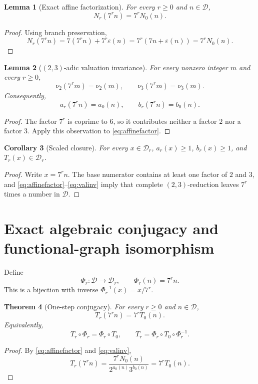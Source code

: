 \documentclass[11pt]{article}
\newtheorem{theorem}{Theorem}[section]
\newtheorem{lemma}[theorem]{Lemma}
\newtheorem{corollary}[theorem]{Corollary}
\newcommand{\eps}{\varepsilon}
\begin{document}
\begin{lemma}[Exact affine factorization]
For every $r\ge0$ and $n\in\mathcal D$,
\begin{equation}
N_r(7^rn)=7^rN_0(n).
\label{eq:affinefactor}
\end{equation}
\end{lemma}
\begin{proof}
Using branch preservation,
\[
N_r(7^rn)=7(7^rn)+7^r\eps(n)=7^r(7n+\eps(n))=7^rN_0(n).
\]
\end{proof}

\begin{lemma}[$(2,3)$-adic valuation invariance]
For every nonzero integer $m$ and every $r\ge0$,
\begin{equation}
\nu_2(7^rm)=\nu_2(m),\qquad \nu_3(7^rm)=\nu_3(m).
\label{eq:valscale}
\end{equation}
Consequently,
\begin{equation}
a_r(7^rn)=a_0(n),\qquad b_r(7^rn)=b_0(n).
\label{eq:valinv}
\end{equation}
\end{lemma}
\begin{proof}
The factor $7^r$ is coprime to $6$, so it contributes neither a factor $2$ nor a factor $3$. Apply this observation to \eqref{eq:affinefactor}.
\end{proof}

\begin{corollary}[Scaled closure]
For every $x\in\mathcal D_r$, $a_r(x)\ge1$, $b_r(x)\ge1$, and $T_r(x)\in\mathcal D_r$.
\end{corollary}
\begin{proof}
Write $x=7^rn$. The base numerator contains at least one factor of $2$ and $3$, and \eqref{eq:affinefactor}--\eqref{eq:valinv} imply that complete $(2,3)$-reduction leaves $7^r$ times a number in $\mathcal D$.
\end{proof}

\section{Exact algebraic conjugacy and functional-graph isomorphism}
Define
\begin{equation}
\Phi_r:\mathcal D\longrightarrow\mathcal D_r,\qquad \Phi_r(n)=7^rn.
\label{eq:Phi}
\end{equation}
This is a bijection with inverse $\Phi_r^{-1}(x)=x/7^r$.

\begin{theorem}[One-step conjugacy]
For every $r\ge0$ and $n\in\mathcal D$,
\begin{equation}
T_r(7^rn)=7^rT_0(n).
\label{eq:onestep}
\end{equation}
Equivalently,
\begin{equation}
T_r\circ\Phi_r=\Phi_r\circ T_0,
\qquad
T_r=\Phi_r\circ T_0\circ\Phi_r^{-1}.
\label{eq:conjugacy}
\end{equation}
\end{theorem}
\begin{proof}
By \eqref{eq:affinefactor} and \eqref{eq:valinv},
\[
T_r(7^rn)
=\frac{7^rN_0(n)}{2^{a_0(n)}3^{b_0(n)}}
=7^rT_0(n).
\]
\end{proof}
\end{document}
